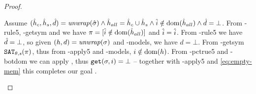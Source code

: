 \begin{proof}

\begin{hypvlist}
 Assume $(\hat{h}_c,\hat{h}_s,\hat{d})=\mathit{unwrap}(\hat{\sigma}) \land \hat{h}_{all}=\hat{h}_c\cup \hat{h}_s \land \hat{i}\notin \operatorname{dom}(\hat{h}_{all}) \land \hat{d}=\bot$.
 From \hyp{rule5}, \hyp{getsym} and  we have $\pi=[\hat{i}\notin\operatorname{dom}(\hat{h}_{all})]$ and $\hat{i}=\hat{i}$.
 From \hyp{rule5} we have $\hat{d}=\bot$, so given $(h,d)={\operatorname{\mathit{unwrap}}}(\sigma)$ and \hyp{models}, we have $d=\bot$.%
 From \hyp{getsym} $\texttt{SAT}_{\mathit{\theta,s}}(\pi)$, thus from \hyp{apply5} and \hyp{models}, $i\notin \operatorname{dom}(h)$.
 From \hyp{pctrue5} and \hyp{botdom} we can apply , thus ${\texttt{get}(\sigma,i)=\bot}$ -- together with \hyp{apply5} and \ref{eq:empty-mem} this completes our goal .
\end{hypvlist}

\end{proof}
